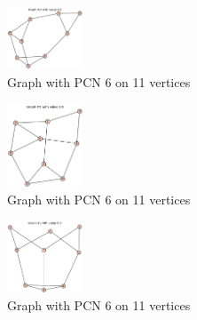 \documentclass[12pt,a4paper]{amsart}
\theoremstyle{definition}
\theoremstyle{plain}
\begin{document}
\begin{figure}[h]
    \centering
    \includegraphics[width=0.2\textwidth]{Images/42}
    \caption{Graph with PCN 6 on 11 vertices}
\end{figure}
\begin{figure}[h]
    \centering
    \includegraphics[width=0.2\textwidth]{Images/43}
    \caption{Graph with PCN 6 on 11 vertices}
\end{figure}
\begin{figure}[h]
    \centering
    \includegraphics[width=0.2\textwidth]{Images/44}
    \caption{Graph with PCN 6 on 11 vertices}
\end{figure}
\end{document}
